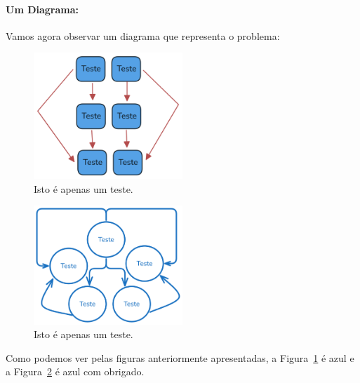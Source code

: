 \paragraph{Um Diagrama:} Vamos agora observar um diagrama que representa o problema:

\begin{figure}[htb!]
    \centering
    \includegraphics[width=0.5\textwidth]{figures/teste}
    \caption{Isto é apenas um teste.}
    \label{fig:teste}
\end{figure}

\begin{figure}[htb!]
    \centering
    \includegraphics[width=0.5\textwidth]{figures/diagrama}
    \caption{Isto é apenas um teste.}
    \label{fig:diagrama}
\end{figure}

Como podemos ver pelas figuras anteriormente apresentadas, a Figura~\ref{fig:teste} é azul e a Figura~\ref{fig:diagrama} é azul com obrigado.
